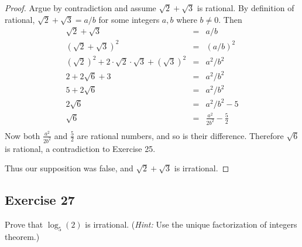 \documentclass[14pt]{extarticle}
\begin{document}
\begin{proof}
    Argue by contradiction and assume $\sqrt{2} + \sqrt{3}$ is rational. By definition of rational, $\sqrt{2} + \sqrt{3} = a/b$ for some integers $a,b$ where $b \neq 0$. Then
    \[
        \begin{array}{rcl}
            \sqrt{2} + \sqrt{3}                                       & = & a/b                            \\
            (\sqrt{2} + \sqrt{3})^2                                   & = & (a/b)^2                        \\
            (\sqrt{2})^2 + 2\cdot\sqrt{2}\cdot\sqrt{3} + (\sqrt{3})^2 & = & a^2/b^2                        \\
            2 + 2\sqrt{6} + 3                                         & = & a^2/b^2                        \\
            5 + 2\sqrt{6}                                             & = & a^2/b^2                        \\
            2\sqrt{6}                                                 & = & a^2/b^2 - 5                    \\
            \sqrt{6}                                                  & = & \frac{a^2}{2b^2} - \frac{5}{2} \\
        \end{array}
    \]
    Now both $\frac{a^2}{2b^2}$ and $\frac{5}{2}$ are rational numbers, and so is their difference. Therefore $\sqrt{6}$ is rational, a contradiction to Exercise 25.

    Thus our supposition was false, and $\sqrt{2}+\sqrt{3}$ is irrational.
\end{proof}

\subsection{Exercise 27}
Prove that $\log_5(2)$ is irrational. ({\it Hint:} Use the unique factorization of integers theorem.)
\end{document}
